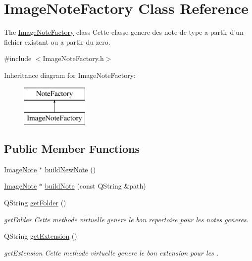 \hypertarget{class_image_note_factory}{\section{Image\-Note\-Factory Class Reference}
\label{class_image_note_factory}
}


The \hyperlink{class_image_note_factory}{Image\-Note\-Factory} class Cette classe genere des note de type  a partir d'un fichier existant ou a partir du zero.  




{\ttfamily \#include $<$Image\-Note\-Factory.\-h$>$}

Inheritance diagram for Image\-Note\-Factory\-:\begin{figure}[H]
\begin{center}
\leavevmode
\includegraphics[height=2.000000cm]{class_image_note_factory}
\end{center}
\end{figure}
\subsection*{Public Member Functions}
\begin{DoxyCompactItemize}
\item 
\hyperlink{class_image_note}{Image\-Note} $\ast$ \hyperlink{class_image_note_factory_ae86040298dd6352332689c8d672b5557}{build\-New\-Note} ()
\item 
\hyperlink{class_image_note}{Image\-Note} $\ast$ \hyperlink{class_image_note_factory_a3e9c32a43db8298f197e0afbfde1fb73}{build\-Note} (const Q\-String \&path)
\item 
Q\-String \hyperlink{class_image_note_factory_a4ecb0b6118e14869adb8961c514d78d4}{get\-Folder} ()
\begin{DoxyCompactList}\small\item\em get\-Folder Cette methode virtuelle genere le bon repertoire pour les notes generes. \end{DoxyCompactList}\item 
Q\-String \hyperlink{class_image_note_factory_a69ec7ba140422d90c5ff7eaacc950714}{get\-Extension} ()
\begin{DoxyCompactList}\small\item\em get\-Extension Cette methode virtuelle genere le bon extension pour les . \end{DoxyCompactList}\end{DoxyCompactItemize}
